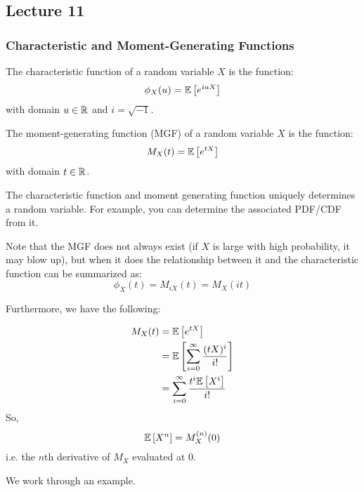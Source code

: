 \subsection{Lecture 11}

\subsubsection{Characteristic and Moment-Generating Functions}
\begin{definition}
    The characteristic function of a random variable $X$ is the function:
    \[ \phi_X(u) = \mathbb{E}\left[ e^{iuX} \right] \]
    with domain $u \in \operatorname{\mathbb{R}}$ and $i = \sqrt{-1}$.
\end{definition}

\begin{definition}
    The moment-generating function (MGF) of a random variable $X$ is the function:
    \[ M_X(t) = \mathbb{E}\left[ e^{tX} \right] \]
    with domain $t \in \operatorname{\mathbb{R}}$.
\end{definition}

The characteristic function and moment generating function uniquely determines a random variable.
For example, you can determine the associated PDF/CDF from it.

Note that the MGF does not always exist (if $X$ is large with high probability, it may blow up), but when it does
the relationship between it and the characteristic function can be summarized as:
\[ \phi_X(t) = M_{iX}(t) = M_X(it) \]

Furthermore, we have the following:
\begin{note}
    \begin{align*}
        M_X(t) &= \mathbb{E}\left[ e^{tX} \right] \\
        &= \mathbb{E}\left[ \sum_{i = 0}^{\infty} \frac{(tX)^i}{i!} \right] \\
        &= \sum_{i = 0}^{\infty} \frac{t^i \mathbb{E}\left[ X^i \right]}{i!}
    \end{align*}
    So,
    \[ \mathbb{E}\left[ X^n \right] = M_X^{(n)} (0) \]
    i.e. the $n$th derivative of $M_X$ evaluated at 0.
\end{note}

We work through an example.


